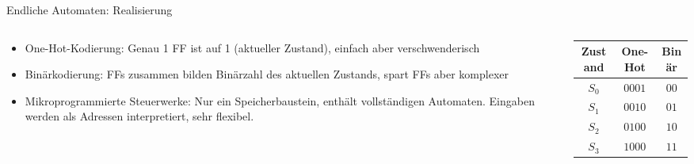 \begin{frame}[fragile, c]{Endliche Automaten: Realisierung}{}
	\begin{columns}[c]
		\begin{column}{0.5\textwidth}
			\begin{itemize}
				\item One-Hot-Kodierung: Genau 1 FF ist auf 1 (aktueller Zustand), einfach aber verschwenderisch
				\item Binärkodierung: FFs zusammen bilden Binärzahl des aktuellen Zustands, spart FFs aber komplexer
				\item Mikroprogrammierte Steuerwerke: Nur ein Speicherbaustein, enthält vollständigen Automaten. Eingaben werden als Adressen interpretiert, sehr flexibel.
			\end{itemize}
		\end{column}
		\begin{column}{0.5\textwidth}
			\begin{table}[]
				\begin{tabular}{c|c|c}
					Zustand & One-Hot & Binär \\ \hline
					$S_0$   & $0001$  & $00$  \\
					$S_1$   & $0010$  & $01$  \\
					$S_2$   & $0100$  & $10$  \\
					$S_3$   & $1000$  & $11$
				\end{tabular}
			\end{table}
		\end{column}
	\end{columns}
\end{frame}

